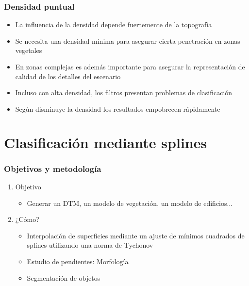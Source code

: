 \begin{frame}
  \frametitle{Densidad puntual}
  \begin{itemize}
    \item La influencia de la densidad depende fuertemente de la topografía
    \item Se necesita una densidad mínima para asegurar cierta penetración en
      zonas vegetales
    \item En zonas complejas es además importante para asegurar la
      representación de calidad de los detalles del escenario
    \item Incluso con alta densidad, los filtros presentan problemas de
      clasificación
    \item Según disminuye la densidad los resultados empobrecen rápidamente
  \end{itemize}
\end{frame}
\section{Clasificación mediante splines}
\begin{frame}
  \frametitle{Objetivos y metodología}
  \begin{enumerate}[<+->]
    \item Objetivo
    \begin{itemize}
       \item Generar un DTM, un modelo de \alert<2>{vegetación}, un modelo de
         \alert<2>{edificios}...
    \end{itemize}
    \item ¿Cómo?
    \begin{itemize}
      \item Interpolación de \alert<4>{superficies} mediante un ajuste de mínimos
            cuadrados de splines utilizando una norma de Tychonov
          \item Estudio de pendientes: \alert<5>{Morfología}
          \item \alert<6>{Segmentación} de objetos
    \end{itemize}
  \end{enumerate}
\end{frame}
